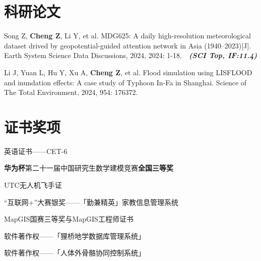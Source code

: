 \documentclass{resume}
\begin{document}
\section{科研论文}
\begin{itemize}[parsep=0.2ex]

\vspace{0.2cm}
  {\small
  \item Song Z, \textbf{Cheng Z}, Li Y, et al. MDG625: A daily high-resolution meteorological dataset drived by geopotential-guided attention network in Asia (1940–2023)[J]. Earth System Science Data Discussions, 2024, 2024: 1-18.~~\textbf{\textit{(SCI Top, IF:11.4)}}

\vspace{0.2cm}
  \item Li J, Yuan L, Hu Y, Xu A, \textbf{Cheng Z}, et al. Flood simulation using LISFLOOD and inundation effects: A case study of Typhoon In-Fa in Shanghai. Science of The Total Environment, 2024, 954: 176372.
        }
\end{itemize}

\vspace{0.1cm}
\section{证书奖项}
\begin{itemize}[parsep=0.2ex]
  {\small
  \item 英语证书——CET-6
  \item \textbf{华为杯}第二十一届中国研究生数学建模竞赛\textbf{全国三等奖}
  \item UTC无人机飞手证
  \item “互联网+”大赛银奖——「勤兼精英」家教信息管理系统
  \item MapGIS国赛三等奖与MapGIS工程师证书
  \item 软件著作权——「狸桥地学数据库管理系统」
  \item 软件著作权——「人体外骨骼协同控制系统」 
}
\end{itemize}
\end{document}
